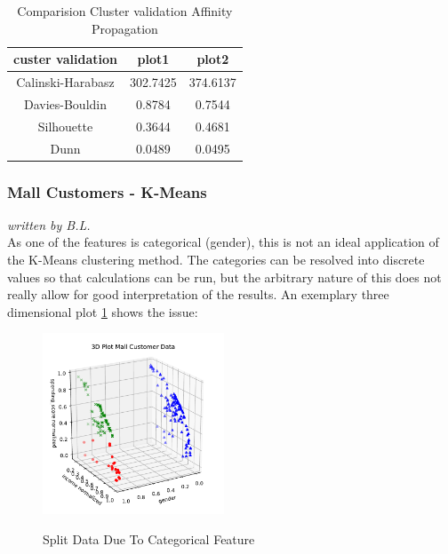 \begin{table}[h!]
	\centering
	\begin{tabular}{||c c c ||} 
		\hline
		custer validation & plot1 & plot2 \\ [0.5ex] 
		\hline\hline
		Calinski-Harabasz & 302.7425	 &  374.6137  \\ 
		Davies-Bouldin & 0.8784	 & 0.7544	 \\
		Silhouette & 0.3644	 & 0.4681	 \\
		Dunn & 0.0489 & 0.0495  \\ [1ex] 
		\hline
	\end{tabular}
	\caption{Comparision Cluster validation Affinity Propagation }
	
\end{table}

\subsubsection{Mall Customers - K-Means}
\textit{written by B.L.}\\

As one of the features is categorical (gender), this is not an ideal application of the K-Means clustering method. The categories can be resolved into discrete values so that calculations can be run, but the arbitrary nature of this does not really allow for good interpretation of the results. An exemplary three dimensional plot \ref{fig:kmeans_customers_3d} shows the issue: 

\begin{figure}
  \centering
    \includegraphics[width=0.48\textwidth, clip]{images/kmeans_customers_3d.pdf}
  \label{fig:kmeans_customers_3d}
  \caption{Split Data Due To {Categorical} Feature}
\end{figure}

